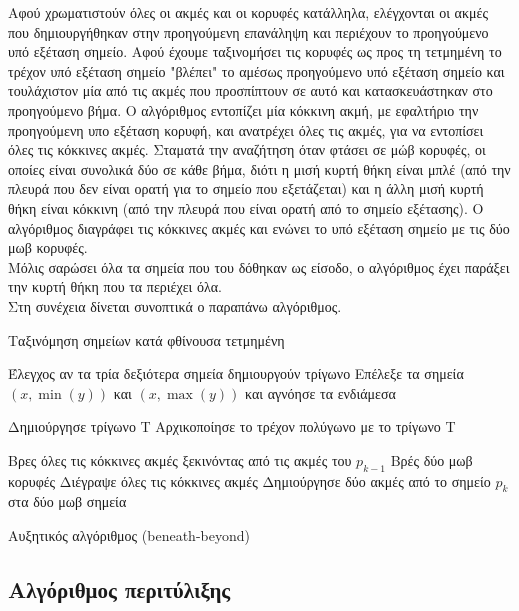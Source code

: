 \documentclass[oneside,12pt]{book}
\theoremstyle{definition}
\begin{document}
Αφού χρωματιστούν όλες οι ακμές και οι κορυφές κατάλληλα, ελέγχονται οι ακμές που δημιουργήθηκαν στην προηγούμενη επανάληψη και περιέχουν το προηγούμενο υπό εξέταση σημείο. Αφού έχουμε ταξινομήσει τις κορυφές ως προς τη τετμημένη το τρέχον υπό εξέταση σημείο "βλέπει" το αμέσως προηγούμενο υπό εξέταση σημείο και τουλάχιστον μία από τις ακμές που προσπίπτουν σε αυτό και κατασκευάστηκαν στο προηγούμενο βήμα. Ο αλγόριθμος εντοπίζει μία κόκκινη ακμή, με εφαλτήριο την προηγούμενη υπο εξέταση κορυφή, και ανατρέχει όλες τις ακμές, για να εντοπίσει όλες τις κόκκινες ακμές. Σταματά την αναζήτηση όταν φτάσει σε μώβ κορυφές, οι οποίες είναι συνολικά δύο σε κάθε βήμα, διότι η μισή κυρτή θήκη είναι μπλέ (από την πλευρά που δεν είναι ορατή για το σημείο που εξετάζεται) και η άλλη μισή κυρτή θήκη είναι κόκκινη (από την πλευρά που είναι ορατή από το σημείο εξέτασης). Ο αλγόριθμος διαγράφει τις κόκκινες ακμές και ενώνει το υπό εξέταση σημείο με τις δύο μωβ κορυφές. \\

Μόλις σαρώσει όλα τα σημεία που του δόθηκαν ως είσοδο, ο αλγόριθμος έχει παράξει την κυρτή θήκη που τα περιέχει όλα. \\

Στη συνέχεια δίνεται συνοπτικά ο παραπάνω αλγόριθμος. \\

\begin{algorithm}[H]
	\SetAlgoLined

	Ταξινόμηση σημείων κατά φθίνουσα τετμημένη \;

	Έλεγχος αν τα τρία δεξιότερα σημεία δημιουργούν τρίγωνο \;
	{Επέλεξε τα σημεία \((x, \min(y))\) και \((x, \max(y))\) και αγνόησε τα ενδιάμεσα\;}

	Δημιούργησε τρίγωνο Τ \;
	Αρχικοποίησε το τρέχον πολύγωνο με το τρίγωνο Τ \;

	{Βρες όλες τις κόκκινες ακμές ξεκινόντας από τις ακμές του \(p_{k-1}\) \;
		Βρές δύο μωβ κορυφές \;
		Διέγραψε όλες τις κόκκινες ακμές \;
		Δημιούργησε δύο ακμές από το σημείο \(p_k\) στα δύο μωβ σημεία \;
	}

	\caption{Αυξητικός αλγόριθμος (beneath-beyond)}
\end{algorithm}

\subsection{Αλγόριθμος περιτύλιξης}
\end{document}
